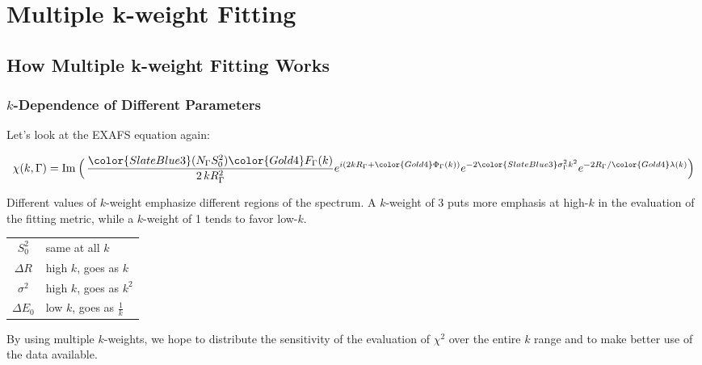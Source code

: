 \documentclass[10pt, xcolor=x11names, compress]{beamer}
\begin{document}
\section[MKW]{Multiple k-weight Fitting}
\subsection[Explain]{How Multiple k-weight Fitting Works}
\begin{frame}
  \frametitle{$k$-Dependence of Different Parameters}

  Let's look at the EXAFS equation again:

  {\small
    \begin{equation}
      \chi(k,\Gamma) = {\Im}\>\Bigl(\, %
      { \frac{{\color{SlateBlue3}(N_\Gamma S_0^2)}{\color{Gold4}F_\Gamma(k)}}
        {2\,kR_\Gamma^2} }
      e^{i(2kR_\Gamma + {\color{Gold4}\Phi_\Gamma(k)})}
      e^{-2{\color{SlateBlue3}\sigma_\Gamma^2}k^2}
      e^{-2R_\Gamma/{\color{Gold4}\lambda(k)}}
      \Bigl) \notag
    \end{equation}}

  Different values of $k$-weight emphasize different regions of the
  spectrum. A $k$-weight of 3 puts more emphasis at high-$k$ in the
  evaluation of the fitting metric, while a $k$-weight of 1 tends to
  favor low-$k$.

  \begin{center}
    \begin{tabular}{cl}
      {\color{SlateBlue3}$S_0^2$}      &  same at all $k$ \\
      {\color{SlateBlue3}$\Delta R$}   & high $k$, goes as $k$ \\
      {\color{SlateBlue3}$\sigma^2$}   & high $k$, goes as $k^2$ \\
      {\color{SlateBlue3}$\Delta E_0$} & low $k$, goes as $\frac{1}{k}$ \\
    \end{tabular}
  \end{center}

  By using multiple $k$-weights, we hope to distribute the sensitivity
  of the evaluation of $\chi^2$ over the entire $k$ range and to make
  better use of the data available.
\end{frame}
\end{document}
